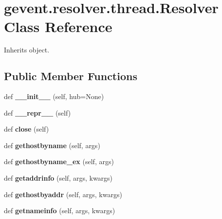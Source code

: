 \hypertarget{classgevent_1_1resolver_1_1thread_1_1_resolver}{}\section{gevent.\+resolver.\+thread.\+Resolver Class Reference}
\label{classgevent_1_1resolver_1_1thread_1_1_resolver}


Inherits object.

\subsection*{Public Member Functions}
\begin{DoxyCompactItemize}
\item 
\mbox{\label{classgevent_1_1resolver_1_1thread_1_1_resolver_ae050ab8dfd724996cbc64c016052ff63}} 
def {\bfseries \+\_\+\+\_\+init\+\_\+\+\_\+} (self, hub=None)
\item 
\mbox{\label{classgevent_1_1resolver_1_1thread_1_1_resolver_a5ef24d6a1315a8646d0e9255905cdd5c}} 
def {\bfseries \+\_\+\+\_\+repr\+\_\+\+\_\+} (self)
\item 
\mbox{\label{classgevent_1_1resolver_1_1thread_1_1_resolver_abd7d75ed4eb812740b6c70c265ddbcdc}} 
def {\bfseries close} (self)
\item 
\mbox{\label{classgevent_1_1resolver_1_1thread_1_1_resolver_a411a65c5a725a8db30f9d260242521f7}} 
def {\bfseries gethostbyname} (self, args)
\item 
\mbox{\label{classgevent_1_1resolver_1_1thread_1_1_resolver_a01a92d62c56e293f66dd435a0c326db5}} 
def {\bfseries gethostbyname\+\_\+ex} (self, args)
\item 
\mbox{\label{classgevent_1_1resolver_1_1thread_1_1_resolver_a1a41a37e6644b09abe0cbe2dd063d4b6}} 
def {\bfseries getaddrinfo} (self, args, kwargs)
\item 
\mbox{\label{classgevent_1_1resolver_1_1thread_1_1_resolver_a64f995b00eebdd7ce5c7463b050cba9b}} 
def {\bfseries gethostbyaddr} (self, args, kwargs)
\item 
\mbox{\label{classgevent_1_1resolver_1_1thread_1_1_resolver_a6617aea84b3e89bda7ca2abe7621f8cb}} 
def {\bfseries getnameinfo} (self, args, kwargs)
\end{DoxyCompactItemize}
